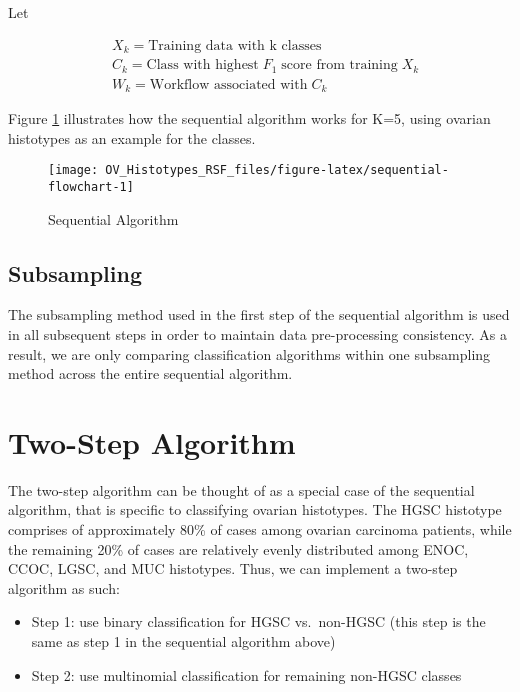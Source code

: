 \documentclass[
]{report}
\providecommand{\tightlist}{%
  \setlength{\itemsep}{0pt}\setlength{\parskip}{0pt}}
\begin{document}
Let

\[
\begin{aligned}
& X_k = \text{Training data with k classes}  \\
& C_k = \text{Class with highest}\;F_1\;\text{score from training}\;X_k \\
& W_k = \text{Workflow associated with}\;C_k
\end{aligned}
\label{eq:sequential}
\]

Figure \ref{fig:sequential-flowchart} illustrates how the sequential algorithm works for K=5, using ovarian histotypes as an example for the classes.

\begin{figure}[H]

{\centering \texttt{[image: OV\_Histotypes\_RSF\_files/figure-latex/sequential-flowchart-1]} 

}

\caption{Sequential Algorithm}\label{fig:sequential-flowchart}
\end{figure}

\hypertarget{subsampling-1}{%
\subsection{Subsampling}\label{subsampling-1}}

The subsampling method used in the first step of the sequential algorithm is used in all subsequent steps in order to maintain data pre-processing consistency. As a result, we are only comparing classification algorithms within one subsampling method across the entire sequential algorithm.

\hypertarget{two-step-algorithm}{%
\section{Two-Step Algorithm}\label{two-step-algorithm}}

The two-step algorithm can be thought of as a special case of the sequential algorithm, that is specific to classifying ovarian histotypes. The HGSC histotype comprises of approximately 80\% of cases among ovarian carcinoma patients, while the remaining 20\% of cases are relatively evenly distributed among ENOC, CCOC, LGSC, and MUC histotypes. Thus, we can implement a two-step algorithm as such:

\begin{itemize}
\tightlist
\item
  Step 1: use binary classification for HGSC vs.~non-HGSC (this step is the same as step 1 in the sequential algorithm above)
\item
  Step 2: use multinomial classification for remaining non-HGSC classes
\end{itemize}
\end{document}
